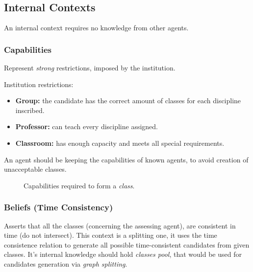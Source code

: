 \subsection{Internal Contexts}

An internal context requires no knowledge from other agents.

\subsubsection{Capabilities}

Represent \emph{strong} restrictions, imposed by the institution.

Institution restrictions:
\begin{itemize}
\item \textbf{Group:} the candidate has the correct amount of classes for each
  discipline inscribed.
\item \textbf{Professor:} can teach every discipline assigned.
\item \textbf{Classroom:} has enough capacity and meets all special requirements.
\end{itemize}

An agent should be keeping the capabilities of known agents, to avoid creation
of unacceptable classes.

\begin{figure}[H]
  \centering
  
  \caption{Capabilities required to form a \emph{class}.}
  \label{fig:capabilities}
\end{figure}


\subsubsection{Beliefs (Time Consistency)}

Asserts that all the classes (concerning the assessing agent), are consistent in
time (do not intersect). This context is a splitting one, it uses the time
consistence relation to generate all possible time-consistent candidates from
given classes. It's internal knowledge should hold \emph{classes pool}, that
would be used for candidates generation via \emph{graph splitting}.


